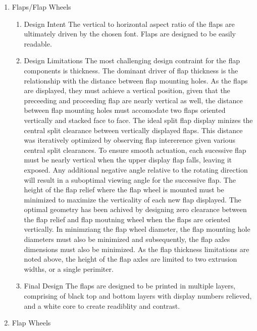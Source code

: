 \documentclass[11pt]{article}
\begin{document}
\begin{enumerate}
\item Flaps/Flap Wheels
\label{sec:org6c111ff}

\begin{enumerate}
\item Design Intent
\label{sec:org5e2febe}
The vertical to horizontal aspect ratio of the flaps are ultimately driven by the chosen font. Flaps are designed to be easily readable.

\item Design Limitations
\label{sec:org9160ac4}
The most challenging design contraint for the flap components is thickness. The dominant driver of flap thickness is the relationship with the distance between flap mounting holes. As the flaps are displayed, they must achieve a vertical position, given that the preceeding and proceeding flap are nearly vertical as well, the distance between flap mounting holes must accomodate two flaps oriented vertically and stacked face to face.
The ideal split flap display minizes the central split clearance between vertically displayed flaps. This distance was iteratively optimized by observing flap intererence given various central split clearances.
To ensure smooth actuation, each sucessive flap must be nearly vertical when the upper display flap falls, leaving it exposed. Any additional negative angle relative to the rotating direction will result in a suboptimal viewing angle for the successive flap. The height of the flap relief where the flap wheel is mounted must be minimized to maximize the verticality of each new flap displayed. The optimal geometry has been achived by designing zero clearance between the flap relief and flap moutning wheel when the flaps are oriented vertically.
In minimziang the flap wheel diameter, the flap mounting hole diameters must also be minimized and subsequently, the flap axles dimensions must also be minimized. As the flap thickness limitations are noted above, the height of the flap axles are limited to two extrusion widths, or a single perimiter.

\item Final Design
\label{sec:org8396a82}
The flaps are designed to be printed in multiple layers, comprising of black top and bottom layers with display numbers relieved, and a white core to create readiblity and contrast.
\end{enumerate}

\item Flap Wheels
\label{sec:org3ecc293}


\end{enumerate}
\end{document}
